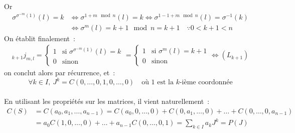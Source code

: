 \documentclass{article}
\begin{document}
  Or
  \begin{align*}
    \sigma^{\sigma^{-m}(1)}(l) = k &\iff \sigma^{1 + m \mod n}(l) = k \iff \sigma^{1 - 1 + m \mod n}(l) = \sigma^{-1}(k)\\
    & \iff \sigma^m(l) = k + 1 \mod n = k + 1 \quad \because 0 < k + 1 < n
  \end{align*}
  On établit finalement~:
  \begin{align*}
    _{k+1} j_{m, l} = \begin{cases}
      1 &\text{si } \sigma^{\sigma^{-m}(1)}(l) = k \\
      0 &\text{sinon}
    \end{cases}
    = \begin{cases}
      1 &\text{si } \sigma^m(l) = k + 1 \\
      0 &\text{sinon}
    \end{cases} \iff (L_{k+1})
  \end{align*}
  on conclut alors par récurrence, et~:
  \[
    \forall k\in I,\: J^k = C(0, \dots, 0, 1, 0, \dots, 0) \quad\text{où 1 est la $k$-ième coordonnée}
  \]

  \paragraph{} En utilisant les propriétés sur les matrices, il vient naturellement~:
  \begin{align*}
    C(S) &= C(a_0, a_1, \dots, a_{n-1}) = C(a_0, 0, \dots, 0) + C(0, a_1, \dots, 0) + \dots +  C(0, \dots, 0, a_{n-1}) \\
    &= a_0C(1, 0, \dots, 0) + \dots + a_{n-1}C(0, \dots, 0, 1) = \sum_{k\in I}a_k J^k = P(J)
  \end{align*}
\end{document}
